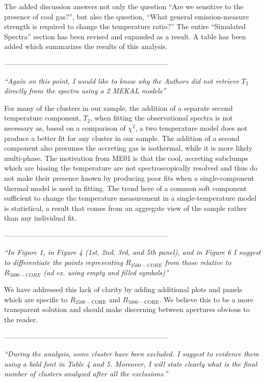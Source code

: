\documentclass[11pt]{article}
\begin{document}
The added discussion answers not only the question
``Are we sensitive to the presence of cool gas?'', but also the
question, ``What general emission-measure strength is required to
change the temperature ratio?'' The entire ``Simulated
Spectra'' section has been revised and expanded as a result. A table
has been added which summarizes the results of this analysis.

---------------------------------------------------------------------

\textit{
``Again on this point, I would like to know why the Authors did not
retrieve $T_2$ directly from the spectra using a 2 MEKAL models''
}

For many of the clusters in our sample, the addition of a separate
second temperature component, $T_2$, when fitting the observational
spectra is not necessary as, based on a comparison of $\chi^2$, a two
temperature model does not produce a better fit for any cluster in our
sample. The addition of a second component also presumes the accreting
gas is isothermal, while it is more likely multi-phase. The motivation
from ME01 is that the cool, accreting subclumps which are biasing the
temperature are not spectroscopically resolved and thus do not make
their presence known by producing poor fits when a single-component
thermal model is used in fitting. The trend here of a common soft
component sufficient to change the temperature measurement in a
single-temperature model is statistical, a result that comes from an
aggregate view of the sample rather than any individual fit.

---------------------------------------------------------------------

\textit{
``In Figure 1, in Figure 4 (1st, 2nd, 3rd, and 5th panel), and in Figure
6 I suggest to differentiate the points representing $R_{2500-CORE}$
from those relative to $R_{5000-CORE}$ (ad ex. using empty and filled
symbols)''
}

We have addressed this lack of clarity by adding additional
plots and panels which are specific to $R_{2500-\mathrm{CORE}}$ and
$R_{5000-\mathrm{CORE}}$. We believe this to be a more transparent
solution and should make discerning between apertures obvious to the
reader.

---------------------------------------------------------------------

\textit{
``During the analysis, some cluster have been excluded. I suggest to
evidence them using a bold font in Table 4 and 5. Moreover, I will
state clearly what is the final number of clusters analyzed after all
the exclusions.''
}
\end{document}

